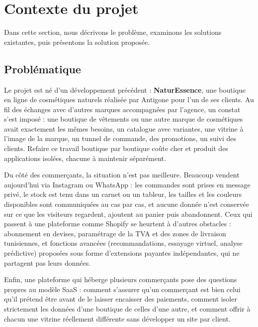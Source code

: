 \section{Contexte du projet}
Dans cette section, nous décrivons le problème, examinons les solutions existantes, puis présentons la solution proposée.

\subsection{Problématique}
Le projet est né d'un développement précédent : \textbf{NaturEssence}, une boutique en ligne de cosmétiques naturels réalisée par Antigone pour l'un de ses clients. Au fil des échanges avec d'autres marques accompagnées par l'agence, un constat s'est imposé : une boutique de vêtements ou une autre marque de cosmétiques avait exactement les mêmes besoins, un catalogue avec variantes, une vitrine à l'image de la marque, un tunnel de commande, des promotions, un suivi des clients. Refaire ce travail boutique par boutique coûte cher et produit des applications isolées, chacune à maintenir séparément.\newline

\vspace{6pt}
Du côté des commerçants, la situation n'est pas meilleure. Beaucoup vendent aujourd'hui via Instagram ou WhatsApp : les commandes sont prises en message privé, le stock est tenu dans un carnet ou un tableur, les tailles et les couleurs disponibles sont communiquées au cas par cas, et aucune donnée n'est conservée sur ce que les visiteurs regardent, ajoutent au panier puis abandonnent. Ceux qui passent à une plateforme comme Shopify se heurtent à d'autres obstacles : abonnement en devises, paramétrage de la TVA et des zones de livraison tunisiennes, et fonctions avancées (recommandations, essayage virtuel, analyse prédictive) proposées sous forme d'extensions payantes indépendantes, qui ne partagent pas leurs données.\newline

\vspace{6pt}
Enfin, une plateforme qui héberge plusieurs commerçants pose des questions propres au modèle SaaS : comment s'assurer qu'un commerçant est bien celui qu'il prétend être avant de le laisser encaisser des paiements, comment isoler strictement les données d'une boutique de celles d'une autre, et comment offrir à chacun une vitrine réellement différente sans développer un site par client.\newline

